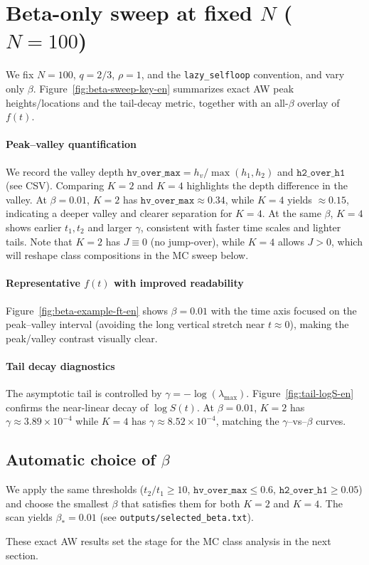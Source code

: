 \section{Beta-only sweep at fixed \texorpdfstring{$N$}{N} (\texorpdfstring{$N=100$}{N=100})}
We fix $N=100$, $q=2/3$, $\rho=1$, and the \texttt{lazy\_selfloop} convention, and vary only $\beta$.
Figure~\ref{fig:beta-sweep-key-en} summarizes exact AW peak heights/locations and the tail-decay metric, together with an all-$\beta$ overlay of $f(t)$.

\paragraph{Peak--valley quantification}
We record the valley depth $\texttt{hv\_over\_max}=h_v/\max(h_1,h_2)$ and $\texttt{h2\_over\_h1}$ (see CSV).
Comparing $K=2$ and $K=4$ highlights the depth difference in the valley.
At $\beta=0.01$, $K=2$ has $\texttt{hv\_over\_max}\approx0.34$, while $K=4$ yields $\approx0.15$, indicating a deeper valley and clearer separation for $K=4$.
At the same $\beta$, $K=4$ shows earlier $t_1,t_2$ and larger $\gamma$, consistent with faster time scales and lighter tails.
Note that $K=2$ has $J\equiv0$ (no jump-over), while $K=4$ allows $J>0$, which will reshape class compositions in the MC sweep below.

\paragraph{Representative \texorpdfstring{$f(t)$}{f(t)} with improved readability}
Figure~\ref{fig:beta-example-ft-en} shows $\beta=0.01$ with the time axis focused on the peak--valley interval (avoiding the long vertical stretch near $t\approx0$), making the peak/valley contrast visually clear.

\paragraph{Tail decay diagnostics}
The asymptotic tail is controlled by $\gamma=-\log(\lambda_{\max})$.
Figure~\ref{fig:tail-logS-en} confirms the near-linear decay of $\log S(t)$.
At $\beta=0.01$, $K=2$ has $\gamma\approx3.89\times10^{-4}$ while $K=4$ has $\gamma\approx8.52\times10^{-4}$, matching the $\gamma$--vs--$\beta$ curves.

\subsection{Automatic choice of \texorpdfstring{$\beta$}{beta}}
We apply the same thresholds ($t_2/t_1\ge10$, $\texttt{hv\_over\_max}\le0.6$, $\texttt{h2\_over\_h1}\ge0.05$) and choose the smallest $\beta$ that satisfies them for both $K=2$ and $K=4$.
The scan yields $\beta_\ast=0.01$ (see \texttt{outputs/selected\_beta.txt}).

These exact AW results set the stage for the MC class analysis in the next section.
